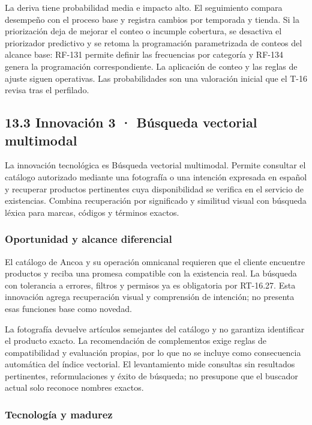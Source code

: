 \documentclass[11pt]{article}
\begin{document}
La deriva tiene probabilidad media e impacto alto. El seguimiento compara desempeño con el proceso base y registra cambios por temporada y tienda. Si la priorización deja de mejorar el conteo o incumple cobertura, se desactiva el priorizador predictivo y se retoma la programación parametrizada de conteos del alcance base: RF-131 permite definir las frecuencias por categoría y RF-134 genera la programación correspondiente. La aplicación de conteo y las reglas de ajuste siguen operativas. Las probabilidades son una valoración inicial que el T-16 revisa tras el perfilado.

\subsection{13.3 Innovación 3 · Búsqueda vectorial multimodal}\label{innovaciuxf3n-3}

La innovación tecnológica es Búsqueda vectorial multimodal. Permite consultar el catálogo autorizado mediante una fotografía o una intención expresada en español y recuperar productos pertinentes cuya disponibilidad se verifica en el servicio de existencias. Combina recuperación por significado y similitud visual con búsqueda léxica para marcas, códigos y términos exactos.

\subsubsection{Oportunidad y alcance diferencial}\label{oportunidad-y-alcance-diferencial}

El catálogo de Ancoa y su operación omnicanal requieren que el cliente encuentre productos y reciba una promesa compatible con la existencia real. La búsqueda con tolerancia a errores, filtros y permisos ya es obligatoria por RT-16.27. Esta innovación agrega recuperación visual y comprensión de intención; no presenta esas funciones base como novedad.

La fotografía devuelve artículos semejantes del catálogo y no garantiza identificar el producto exacto. La recomendación de complementos exige reglas de compatibilidad y evaluación propias, por lo que no se incluye como consecuencia automática del índice vectorial. El levantamiento mide consultas sin resultados pertinentes, reformulaciones y éxito de búsqueda; no presupone que el buscador actual solo reconoce nombres exactos.

\subsubsection{Tecnología y madurez}\label{tecnologuxeda-y-madurez-2}
\end{document}
